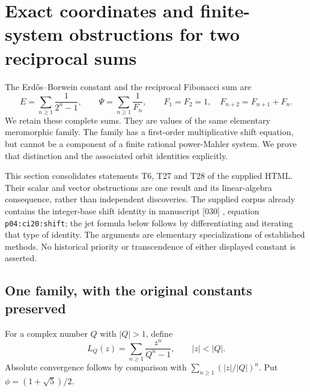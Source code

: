 \documentclass[11pt,a4paper]{article}
\theoremstyle{definition}\newtheorem{definition}[theorem]{Definition}
\theoremstyle{remark}\newtheorem{remark}[theorem]{Remark}
\begin{document}
\section{Exact coordinates and finite-system obstructions for two reciprocal sums}
\label{qor:section}

The Erd\H{o}s--Borwein constant and the reciprocal Fibonacci sum are
\[
 E=\sum_{n\geq1}\frac{1}{2^n-1},\qquad
 \Psi=\sum_{n\geq1}\frac1{F_n},
 \qquad F_1=F_2=1,\quad F_{n+2}=F_{n+1}+F_n.
\]
We retain these complete sums.  They are values of the same elementary
meromorphic family.  The family has a first-order multiplicative
shift equation, but cannot be a component of a finite rational
power-Mahler system.  We prove that distinction and the associated
orbit identities explicitly.

This section consolidates statements T6, T27 and T28 of the supplied
HTML.  Their scalar and vector obstructions are one result and its
linear-algebra consequence, rather than independent discoveries.
The supplied corpus already contains the integer-base shift identity
in manuscript [030] \cite{Corpus030}, equation \texttt{p04:ci20:shift}; the jet formula
below follows by differentiating and iterating that type of identity.
The arguments are elementary specializations of established methods.
No historical priority or transcendence of either displayed constant
is asserted.

\subsection{One family, with the original constants preserved}

For a complex number $Q$ with $|Q|>1$, define
\begin{equation}\label{qor:L}
 L_Q(z)=\sum_{n\geq1}\frac{z^n}{Q^n-1},\qquad |z|<|Q|.
\end{equation}
Absolute convergence follows by comparison with
$\sum_{n\geq1}(|z|/|Q|)^n$.  Put $\phi=(1+\sqrt5)/2$.
\end{document}
